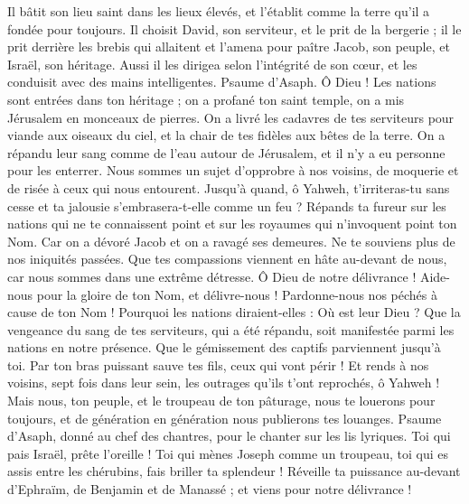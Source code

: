 \begin{multicols}{2}
Il bâtit son lieu saint dans les lieux élevés, et l'établit comme la terre qu'il a fondée pour toujours.
Il choisit David, son serviteur, et le prit de la bergerie ;
il le prit derrière les brebis qui allaitent et l'amena pour paître Jacob, son peuple, et Israël, son héritage.
Aussi il les dirigea selon l'intégrité de son cœur, et les conduisit avec des mains intelligentes.
\VerseOne{}Psaume d'Asaph. Ô Dieu ! Les nations sont entrées dans ton héritage ; on a profané ton saint temple, on a mis Jérusalem en monceaux de pierres.
On a livré les cadavres de tes serviteurs pour viande aux oiseaux du ciel, et la chair de tes fidèles aux bêtes de la terre.
On a répandu leur sang comme de l'eau autour de Jérusalem, et il n'y a eu personne pour les enterrer.
Nous sommes un sujet d’opprobre à nos voisins, de moquerie et de risée à ceux qui nous entourent.
Jusqu’à quand, ô Yahweh, t’irriteras-tu sans cesse et ta jalousie s'embrasera-t-elle comme un feu ?
Répands ta fureur sur les nations qui ne te connaissent point et sur les royaumes qui n'invoquent point ton Nom.
Car on a dévoré Jacob et on a ravagé ses demeures.
Ne te souviens plus de nos iniquités passées. Que tes compassions viennent en hâte au-devant de nous, car nous sommes dans une extrême détresse.
Ô Dieu de notre délivrance ! Aide-nous pour la gloire de ton Nom, et délivre-nous ! Pardonne-nous nos péchés à cause de ton Nom !
Pourquoi les nations diraient-elles : Où est leur Dieu ? Que la vengeance du sang de tes serviteurs, qui a été répandu, soit manifestée parmi les nations en notre présence.
Que le gémissement des captifs parviennent jusqu’à toi. Par ton bras puissant sauve tes fils, ceux qui vont périr !
Et rends à nos voisins, sept fois dans leur sein, les outrages qu’ils t’ont reprochés, ô Yahweh !
Mais nous, ton peuple, et le troupeau de ton pâturage, nous te louerons pour toujours, et de génération en génération nous publierons tes louanges.
\VerseOne{}Psaume d'Asaph, donné au chef des chantres, pour le chanter sur les lis lyriques.
Toi qui pais Israël, prête l'oreille ! Toi qui mènes Joseph comme un troupeau, toi qui es assis entre les chérubins, fais briller ta splendeur !
Réveille ta puissance au-devant d'Ephraïm, de Benjamin et de Manassé ; et viens pour notre délivrance !

\end{multicols}
